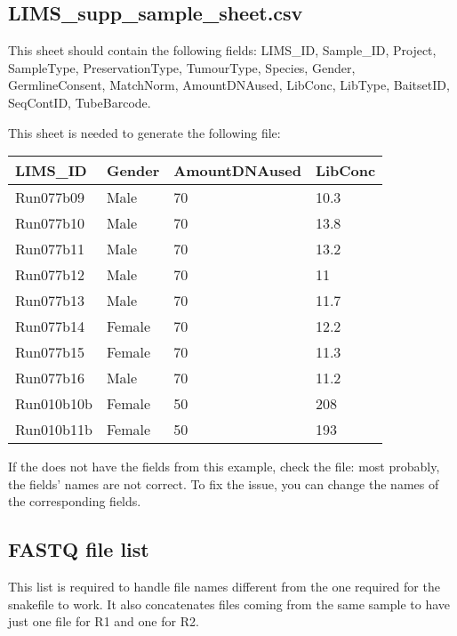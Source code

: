\subsection{LIMS\_supp\_sample\_sheet.csv}
This sheet should contain the following fields: LIMS\_ID, Sample\_ID, Project, SampleType, PreservationType, TumourType, Species, Gender, GermlineConsent, MatchNorm, AmountDNAused, LibConc, LibType, BaitsetID, SeqContID, TubeBarcode.

This sheet is needed to generate the following  file:

\begin{table}[!ht]
    \centering
    \begin{tabular}{llll}
    \hline
        \textbf{LIMS\_ID} & \textbf{Gender} & \textbf{AmountDNAused} & \textbf{LibConc} \\ \hline
        Run077b09 & Male & 70 & 10.3 \\ 
        Run077b10 & Male & 70 & 13.8 \\ 
        Run077b11 & Male & 70 & 13.2 \\ 
        Run077b12 & Male & 70 & 11 \\ 
        Run077b13 & Male & 70 & 11.7 \\ 
        Run077b14 & Female & 70 & 12.2 \\ 
        Run077b15 & Female & 70 & 11.3 \\ 
        Run077b16 & Male & 70 & 11.2 \\ 
        Run010b10b & Female & 50 & 208 \\ 
        Run010b11b & Female & 50 & 193 \\ \hline
    \end{tabular}
\end{table}

If the  does not have the fields from this example, check the   file: most probably, the fields' names are not correct. To fix the issue, you can change the names of the corresponding fields. 

\subsection{FASTQ file list}
This list is required to handle file names different from the one required for the snakefile to work. It also concatenates files coming from the same sample to have just one file for R1 and one for R2. 

